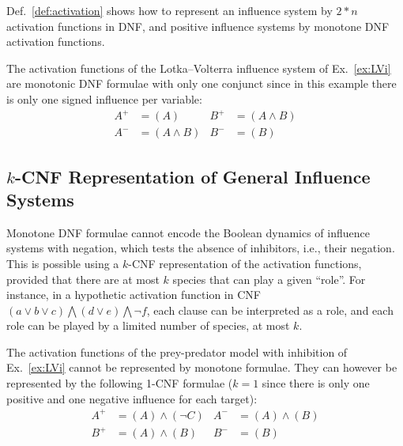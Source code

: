 \documentclass{llncs}
\begin{document}
Def.~\ref{def:activation} shows how to represent an influence system by $2*n$ activation functions in DNF, 
and positive influence systems by monotone DNF activation functions.

\begin{example}
The activation functions of the Lotka--Volterra influence system of Ex.~\ref{ex:LVi}
are monotonic DNF formulae with only one conjunct since in this example there is only one signed influence per variable:
\begin{align*}
   A^+&=(A)& B^+&=(A\wedge B)\\
   A^-&=(A \wedge B)& B^-&=(B)
\end{align*}

\end{example}


\subsection{$k$-CNF Representation of General Influence Systems}
\label{sec:kcnf}

Monotone DNF formulae cannot encode the Boolean dynamics of influence systems with negation,
which tests the absence of inhibitors, i.e., their negation.
This is possible using a $k$-CNF representation of the activation functions,
provided that there are at most $k$ species that can play a given ``role''. 
For instance, in a hypothetic activation function in CNF
$
\left(a \vee b \vee c\right) \bigwedge
\left(d \vee e\right) \bigwedge 
\neg f
$,
each clause can be interpreted as a role, and each role can be played by a limited number of species, at most $k$.


\begin{example}
   The activation functions of the prey-predator model with inhibition of Ex.~\ref{ex:LVi} cannot be
   represented by monotone formulae. They can however be represented by the following 1-CNF
   formulae ($k=1$ since there is only one positive and one
   negative influence for each target):
\begin{align*}
   A^+&=(A)\wedge(\neg C)& A^-&=(A) \wedge (B)\\
   B^+&=(A)\wedge (B)& B^-&=(B)
\end{align*}

\end{example}
\end{document}

